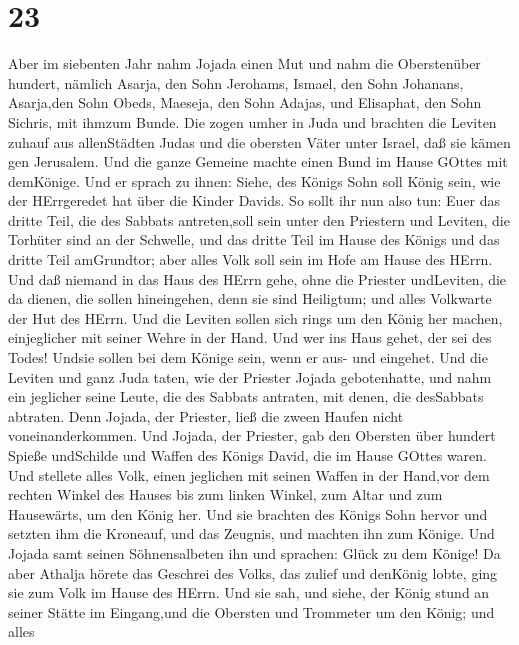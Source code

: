 \hypertarget{section-22}{%
\section{23}\label{section-22}}

 Aber im siebenten Jahr nahm Jojada einen Mut und nahm die
Oberstenüber hundert, nämlich Asarja, den Sohn Jerohams, Ismael, den
Sohn Johanans, Asarja,den Sohn Obeds, Maeseja, den Sohn Adajas, und
Elisaphat, den Sohn Sichris, mit ihmzum Bunde.  Die zogen
umher in Juda und brachten die Leviten zuhauf aus allenStädten Judas und
die obersten Väter unter Israel, daß sie kämen gen Jerusalem.
 Und die ganze Gemeine machte einen Bund im Hause GOttes mit
demKönige. Und er sprach zu ihnen: Siehe, des Königs Sohn soll König
sein, wie der HErrgeredet hat über die Kinder Davids.  So
sollt ihr nun also tun: Euer das dritte Teil, die des Sabbats
antreten,soll sein unter den Priestern und Leviten, die Torhüter sind an
der Schwelle,  und das dritte Teil im Hause des Königs und
das dritte Teil amGrundtor; aber alles Volk soll sein im Hofe am Hause
des HErrn.  Und daß niemand in das Haus des HErrn gehe, ohne
die Priester undLeviten, die da dienen, die sollen hineingehen, denn sie
sind Heiligtum; und alles Volkwarte der Hut des HErrn.  Und
die Leviten sollen sich rings um den König her machen, einjeglicher mit
seiner Wehre in der Hand. Und wer ins Haus gehet, der sei des Todes!
Undsie sollen bei dem Könige sein, wenn er aus- und eingehet.
 Und die Leviten und ganz Juda taten, wie der Priester
Jojada gebotenhatte, und nahm ein jeglicher seine Leute, die des Sabbats
antraten, mit denen, die desSabbats abtraten. Denn Jojada, der Priester,
ließ die zween Haufen nicht voneinanderkommen.  Und Jojada,
der Priester, gab den Obersten über hundert Spieße undSchilde und Waffen
des Königs David, die im Hause GOttes waren.  Und stellete
alles Volk, einen jeglichen mit seinen Waffen in der Hand,vor dem
rechten Winkel des Hauses bis zum linken Winkel, zum Altar und zum
Hausewärts, um den König her.  Und sie brachten des Königs
Sohn hervor und setzten ihm die Kroneauf, und das Zeugnis, und machten
ihn zum Könige. Und Jojada samt seinen Söhnensalbeten ihn und sprachen:
Glück zu dem Könige!  Da aber Athalja hörete das Geschrei
des Volks, das zulief und denKönig lobte, ging sie zum Volk im Hause des
HErrn.  Und sie sah, und siehe, der König stund an seiner
Stätte im Eingang,und die Obersten und Trommeter um den König; und alles
